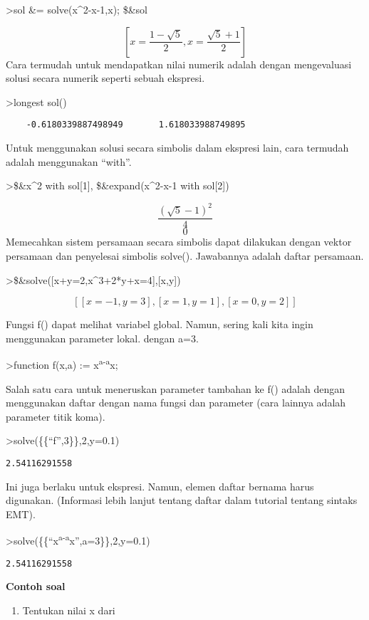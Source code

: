 \documentclass[
]{book}
\providecommand{\tightlist}{%
  \setlength{\itemsep}{0pt}\setlength{\parskip}{0pt}}
\begin{document}
\textgreater sol \&= solve(x\^{}2-x-1,x); \$\&sol

\[\left[ x=\frac{1-\sqrt{5}}{2} , x=\frac{\sqrt{5}+1}{2} \right]\]Cara termudah untuk mendapatkan nilai numerik adalah dengan mengevaluasi solusi secara numerik seperti sebuah ekspresi.

\textgreater longest sol()

\begin{verbatim}
    -0.6180339887498949       1.618033988749895 
\end{verbatim}

Untuk menggunakan solusi secara simbolis dalam ekspresi lain, cara termudah adalah menggunakan ``with''.

\textgreater\$\&x\^{}2 with sol{[}1{]}, \$\&expand(x\^{}2-x-1 with sol{[}2{]})

\[\frac{\left(\sqrt{5}-1\right)^2}{4}\] \[0\] Memecahkan sistem persamaan secara simbolis dapat dilakukan dengan vektor persamaan dan penyelesai simbolis solve(). Jawabannya adalah daftar persamaan.

\textgreater\$\&solve({[}x+y=2,x\^{}3+2*y+x=4{]},{[}x,y{]})

\[\left[ \left[ x=-1 , y=3 \right]  , \left[ x=1 , y=1 \right]  , \left[ x=0 , y=2 \right]  \right]\]

Fungsi f() dapat melihat variabel global. Namun, sering kali kita ingin menggunakan parameter lokal. dengan a=3.

\textgreater function f(x,a) := x\textsuperscript{a-a}x;

Salah satu cara untuk meneruskan parameter tambahan ke f() adalah dengan menggunakan daftar dengan nama fungsi dan parameter (cara lainnya adalah parameter titik koma).

\textgreater solve(\{\{``f'',3\}\},2,y=0.1)

\begin{verbatim}
2.54116291558
\end{verbatim}

Ini juga berlaku untuk ekspresi. Namun, elemen daftar bernama harus digunakan. (Informasi lebih lanjut tentang daftar dalam tutorial tentang sintaks EMT).

\textgreater solve(\{\{``x\textsuperscript{a-a}x'',a=3\}\},2,y=0.1)

\begin{verbatim}
2.54116291558
\end{verbatim}

\textbf{Contoh soal}

\begin{enumerate}
\def\labelenumi{\arabic{enumi}.}
\tightlist
\item
  Tentukan nilai x dari
\end{enumerate}
\end{document}

